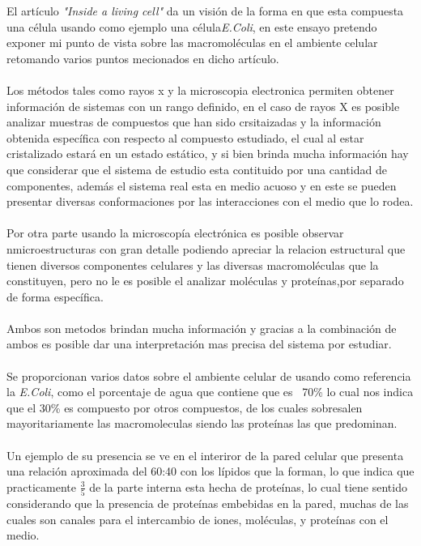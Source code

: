 \documentclass[10pt]{article}
\title{\bt{Macromoleculas en la estructura celular.}}
\author{Perez Alvarado Luis Raymundo, Facultad de Quimica, UNAM}
\date{6 de Octubre de 2020}
\newcommand{\np}[1]{\paragraph{\normalfont{#1}}}
\newcommand{\et}[1]{\emph{#1}}
\begin{document}
    \maketitle

    El artículo \et{"Inside a living cell"} \cite{article:article} da un visión de la forma en que esta compuesta una célula usando como ejemplo una célula\et{E.Coli}, en este ensayo\cite{web:Elsevier} pretendo exponer mi punto de vista sobre las macromoléculas en el ambiente celular retomando varios puntos mecionados en dicho artículo.\np{}

    Los métodos tales como rayos x y la microscopia electronica permiten obtener información de sistemas con un rango definido, en el caso de rayos X es posible analizar muestras de compuestos que han sido crsitaizadas y la información obtenida específica con respecto al compuesto estudiado, el cual al estar cristalizado estará en un estado estático, y si bien brinda mucha información hay que considerar que el sistema de estudio esta contituido por una cantidad de componentes, además el sistema real esta en medio acuoso y en este se pueden presentar diversas conformaciones por las interacciones con el medio que lo rodea.\np{}

    Por otra parte usando la microscopía electrónica es posible observar nmicroestructuras con gran detalle podiendo apreciar la relacion estructural que tienen diversos componentes celulares y las diversas macromoléculas que la constituyen, pero no le es posible el analizar moléculas y proteínas,por separado de forma específica.\np{}

    Ambos son metodos brindan mucha información y gracias a la combinación de ambos es posible dar una interpretación mas precisa del sistema por estudiar.\np{}
    
    Se proporcionan varios datos sobre el ambiente celular de usando como referencia la \et{E.Coli}, como el porcentaje de agua que contiene que es ~70\% lo cual nos indica que el 30\% es compuesto por otros compuestos, de los cuales sobresalen mayoritariamente las macromoleculas siendo las proteínas las que predominan. \np{}

    Un ejemplo de su presencia se ve en el interiror de la pared celular que presenta una relación aproximada del 60:40 con los lípidos que la forman, lo que indica que practicamente $\frac{3}{5}$ de la parte interna esta hecha de proteínas, lo cual tiene sentido considerando que la presencia de proteínas embebidas en la pared, muchas de las cuales son canales para el intercambio de iones, moléculas, y proteínas con el medio.\np{}
\end{document}

